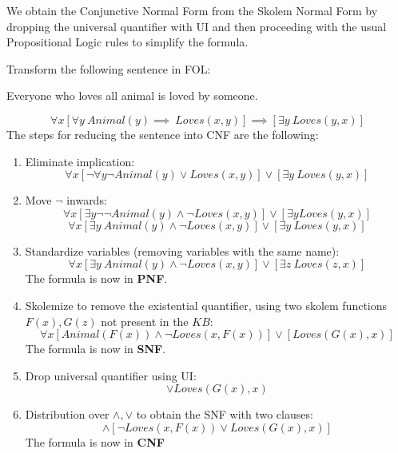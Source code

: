 \documentclass{article}
\begin{document}
We obtain the Conjunctive Normal Form from the Skolem Normal Form by dropping the universal quantifier with UI and then proceeding with the usual Propositional Logic rules to simplify the formula.

\newpage

Transform the following sentence in FOL:

\begin{center}
    Everyone who loves all animal is loved by someone.
\end{center}

\begin{equation*}
    \forall x [\forall y\ Animal(y) \implies\ Loves(x, y)] \implies [\exists y\ Loves(y, x)]
\end{equation*}
The steps for reducing the sentence into CNF are the following:

\begin{enumerate}
    \item Eliminate implication:
    \begin{equation*}
        \forall x [\neg \forall y \neg Animal(y) \lor Loves(x, y)] \lor [\exists y\ Loves(y, x)]
    \end{equation*}
    \item Move $\neg$ inwards:
    \begin{equation*}
        \forall x [\exists y \neg \neg Animal(y) \land \neg Loves(x, y)] \lor [\exists y Loves(y, x)]
    \end{equation*}
    \begin{equation*}
        \forall x [\exists y\ Animal(y) \land \neg Loves(x, y)] \lor [\exists y\ Loves(y, x)]
    \end{equation*}
    \item Standardize variables (removing variables with the same name):
    \begin{equation*}
        \forall x [\exists y\ Animal(y) \land \neg Loves(x,y)] \lor [\exists z\ Loves(z, x)]
    \end{equation*}
    The formula is now in \textbf{PNF}.
    \item Skolemize to remove the existential quantifier, using two skolem functions $F(x), G(z)$ not present in the $KB$:
    \begin{equation*}
        \forall x [Animal(F(x)) \land \neg Loves(x,F(x))] \lor [Loves(G(x), x)]
    \end{equation*}
    The formula is now in \textbf{SNF}.
    \item Drop universal quantifier using UI:
    \begin{equation*}
        [Animal(F(x)) \land \neg Loves(x,F(x))] \lor Loves(G(x), x)
    \end{equation*}
    \item Distribution over $\land, \lor$ to obtain the SNF with two clauses:
    \begin{equation*}
        [Animal(F(x)) \lor Loves(G(x), x)] \land [\neg Loves(x, F(x)) \lor Loves(G(x), x)]
    \end{equation*}
    The formula is now in \textbf{CNF}
\end{enumerate}
\end{document}
